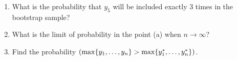 \documentclass[12pt]{article}
\let\P\relax
\DeclareMathOperator{\P}{\mathbb{P}}
\begin{document}
\begin{enumerate}
\begin{enumerate}
    \item What is the probability that $y_5$ will be included exactly 3 times in the bootstrap sample?
    \item What is the limit of probability in the point (a) when $n\to\infty$?
    \item Find the probability $\P(\max\{y_1, \ldots, y_n\} > \max\{y_1^*, \ldots, y_n^*\})$.
\end{enumerate}


\end{enumerate}
\end{document}
